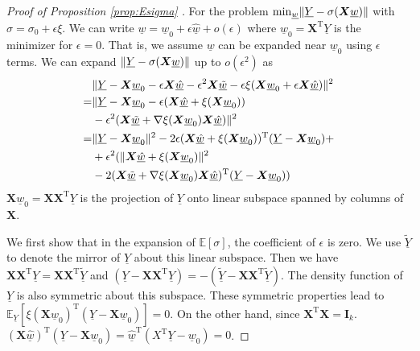 \documentclass[conference]{IEEEtran}
\DeclarePairedDelimiter\norm{\lVert}{\rVert}
\def\E{\mathbb{E}}
\def\T{\mathrm{T}}
\begin{document}
\begin{proof}[Proof of Proposition \ref{prop:Esigma} ]
For the problem $\min_{\underline{w}} \norm{\underline{Y} - \sigma(\bm{X} \underline{w})}$
with $\sigma = \sigma_0 + \epsilon \xi$. We can write $\underline{w} = \underline{w}_0
+ \epsilon \underline{\hat{w}} + o(\epsilon)$ where $\underline{w}_0 = \bm{X}^\T \underline{Y}$ is the minimizer for
$\epsilon = 0$. That is, we assume $\underline{w}$ can be expanded near $\underline{w}_0$
using $\epsilon$ terms. We can expand $\norm{\underline{Y} - \sigma(\bm{X} \underline{w})}$ 
up to $o(\epsilon^2)$ as
\begin{align*}
&\norm{\underline{Y} - \bm{X} \underline{w}_0 - \epsilon \bm{X} \underline{\hat{w}} -
\epsilon^2 \bm{X} \underline{\tilde{w}} - \epsilon \xi(\bm{X} \underline{w}_0 +
\epsilon \bm{X} \underline{\hat{w}}) }^2 \\
= & \norm{ \underline{Y} - \bm{X}  \underline{w}_0 -
\epsilon (\bm{X}\underline{\hat{w}} + \xi(\bm{X} \underline{w}_0 )) \\
&-  \epsilon^2(\bm{X}\underline{\tilde{w}} + \nabla \xi(\bm{X} \underline{w}_0 )\bm{X}\underline{\hat{w}})}^2 \\
= & \norm{\underline{Y}-\bm{X} \underline{w}_0  }^2 -
2 \epsilon (\bm{X} \underline{\hat{w}} +
\xi(\bm{X} \underline{w}_0))^\T (\underline{Y} - \bm{X} \underline{w}_0) +\\
& +  \epsilon^2(\norm{\bm{X}\underline{\hat{w}} + \xi(\bm{X} \underline{w}_0)}^2 \\
& -
2 (\bm{X} \underline{\tilde{w}}+
\nabla \xi(\bm{X} \underline{w}_0)\bm{X}\underline{\hat{w}})^\T(\underline{Y}-\bm{X} \underline{w}_0))
\end{align*}
$\bm{X}\underline{w}_0 = \bm{X}\bm{X}^\T \underline{Y}$ is the projection of $\underline{Y}$ onto linear subspace spanned by
columns of $\bm{X}$.

We first show that in the expansion of $\E[\sigma]$, the coefficient of $\epsilon$ is zero.
We use $\tilde{\underline{Y}}$ to denote the mirror of $\underline{Y}$ about this linear subspace.
Then we have
$\bm{X}\bm{X}^\T \underline{Y} = \bm{X}\bm{X}^\T \tilde{\underline{Y}}$ and
$(\underline{Y}- \bm{X}\bm{X}^\T\underline{Y}) = -(\tilde{\underline{Y}} - \bm{X}\bm{X}^\T \tilde{\underline{Y}})$.
The density function of $\underline{Y}$ is also symmetric about this subspace.
These symmetric properties lead to $\E_{\underline{Y}}[\xi(\bm{X}\underline{w}_0)^\T (\underline{Y}-\bm{X}\underline{w}_0)]=0$.
On the other hand, since $\bm{X}^\T \bm{X} = \mathbf{I}_k$. $(\bm{X}\underline{\hat{w}})^\T (\underline{Y}-\bm{X}\underline{w}_0) = \underline{\hat{w}}^\T (X^\T \underline{Y} - \underline{w}_0) = 0$.


\end{proof}
\end{document}
